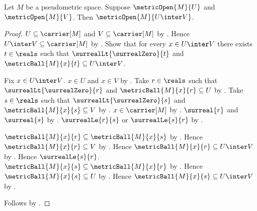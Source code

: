 \begin{theorem}\label{metric_open_intersection}
    Let $M$ be a pseudometric space.
    Suppose $\metricOpen{M}{U}$ and $\metricOpen{M}{V}$.
    Then $\metricOpen{M}{U\inter V}$.
\end{theorem}
\begin{proof}
    $U\subseteq\carrier[M]$ and $V\subseteq\carrier[M]$
        by .
    Hence $U\inter V\subseteq\carrier[M]$
        by .
    Show that for every $x\in U\inter V$ there exists $t\in\reals$
        such that $\surrealLt{\surrealZero}{t}$ and
            $\metricBall{M}{x}{t}\subseteq U\inter V$.
    \begin{subproof}
        Fix $x\in U\inter V$.
        $x\in U$ and $x\in V$ by .
        Take $r\in\reals$ such that
            $\surrealLt{\surrealZero}{r}$ and
            $\metricBall{M}{x}{r}\subseteq U$
            by .
        Take $s\in\reals$ such that
            $\surrealLt{\surrealZero}{s}$ and
            $\metricBall{M}{x}{s}\subseteq V$
            by .
        $x\in\carrier[M]$ by .
        $\surreal{r}$ and $\surreal{s}$
            by .
        $\surrealLe{r}{s}$ or $\surrealLe{s}{r}$
            by .
        \begin{byCase}
                $\metricBall{M}{x}{r}\subseteq\metricBall{M}{x}{s}$
                    by .
                Hence $\metricBall{M}{x}{r}\subseteq V$
                    by .
                Hence $\metricBall{M}{x}{r}\subseteq U\inter V$
                    by .
                Hence $\surrealLe{s}{r}$.
                $\metricBall{M}{x}{s}\subseteq\metricBall{M}{x}{r}$
                    by .
                Hence $\metricBall{M}{x}{s}\subseteq U$
                    by .
                Hence $\metricBall{M}{x}{s}\subseteq U\inter V$
                    by .
        \end{byCase}
    \end{subproof}
    Follows by .
\end{proof}

